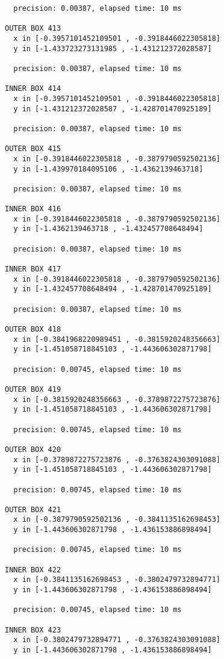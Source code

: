 \begin{verbatim}
  precision: 0.00387, elapsed time: 10 ms

OUTER BOX 413
  x in [-0.3957101452109501 , -0.3918446022305818]
  y in [-1.433723273131985 , -1.431212372028587]

  precision: 0.00387, elapsed time: 10 ms

INNER BOX 414
  x in [-0.3957101452109501 , -0.3918446022305818]
  y in [-1.431212372028587 , -1.428701470925189]

  precision: 0.00387, elapsed time: 10 ms

OUTER BOX 415
  x in [-0.3918446022305818 , -0.3879790592502136]
  y in [-1.439970184095106 , -1.4362139463718]

  precision: 0.00387, elapsed time: 10 ms

INNER BOX 416
  x in [-0.3918446022305818 , -0.3879790592502136]
  y in [-1.4362139463718 , -1.432457708648494]

  precision: 0.00387, elapsed time: 10 ms

INNER BOX 417
  x in [-0.3918446022305818 , -0.3879790592502136]
  y in [-1.432457708648494 , -1.428701470925189]

  precision: 0.00387, elapsed time: 10 ms

OUTER BOX 418
  x in [-0.3841968220989451 , -0.3815920248356663]
  y in [-1.451058718845103 , -1.443606302871798]

  precision: 0.00745, elapsed time: 10 ms

OUTER BOX 419
  x in [-0.3815920248356663 , -0.3789872275723876]
  y in [-1.451058718845103 , -1.443606302871798]

  precision: 0.00745, elapsed time: 10 ms

OUTER BOX 420
  x in [-0.3789872275723876 , -0.3763824303091088]
  y in [-1.451058718845103 , -1.443606302871798]

  precision: 0.00745, elapsed time: 10 ms

OUTER BOX 421
  x in [-0.3879790592502136 , -0.3841135162698453]
  y in [-1.443606302871798 , -1.436153886898494]

  precision: 0.00745, elapsed time: 10 ms

INNER BOX 422
  x in [-0.3841135162698453 , -0.3802479732894771]
  y in [-1.443606302871798 , -1.436153886898494]

  precision: 0.00745, elapsed time: 10 ms

INNER BOX 423
  x in [-0.3802479732894771 , -0.3763824303091088]
  y in [-1.443606302871798 , -1.436153886898494]


\end{verbatim}
